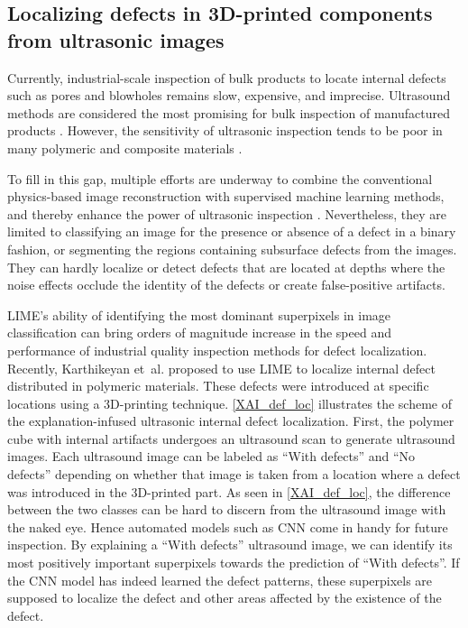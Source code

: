 \documentclass{article}
\theoremstyle{plain}
\theoremstyle{definition}
\theoremstyle{remark}
\begin{document}
\subsection{Localizing defects in 3D-printed components from ultrasonic images}
Currently, industrial-scale inspection of bulk products to locate internal defects such as pores and blowholes remains slow, expensive, and imprecise. Ultrasound methods are considered the most promising for bulk inspection of manufactured products \cite{brinksmeier1984nondestructive}. However, the sensitivity of ultrasonic inspection tends to be poor in many polymeric and composite materials \cite{bakaric2021}. 

To fill in this gap, multiple efforts are underway to combine the conventional physics-based image reconstruction with supervised machine learning methods, and thereby enhance the power of ultrasonic inspection \cite{gardner2020machine}. Nevertheless, they are limited to classifying an image for the presence or absence of a defect in a binary fashion, or segmenting the regions containing subsurface defects from the images. They can hardly localize or detect defects that are located at depths where the noise effects occlude the identity of the defects or create false-positive artifacts.

LIME's ability of identifying the most dominant superpixels in image classification can bring orders of magnitude increase in the speed and performance of industrial quality inspection methods for defect localization. Recently, Karthikeyan et~al.  proposed to use LIME to localize internal defect distributed in polymeric materials. These defects were introduced at specific locations using a 3D-printing technique. \cref{XAI_def_loc} illustrates the scheme of the explanation-infused ultrasonic internal defect localization. First, the polymer cube with internal artifacts undergoes an ultrasound scan to generate ultrasound images. Each ultrasound image can be labeled as ``With defects'' and ``No defects'' depending on whether that image is taken from a location where a defect was introduced in the 3D-printed part. As seen in \cref{XAI_def_loc}, the difference between the two classes can be hard to discern from the ultrasound image with the naked eye. Hence automated models such as CNN come in handy for future inspection. By explaining a ``With defects'' ultrasound image, we can identify its most positively important superpixels towards the prediction of ``With defects''. If the CNN model has indeed learned the defect patterns, these superpixels are supposed to localize the defect and other areas affected by the existence of the defect. 
\end{document}
